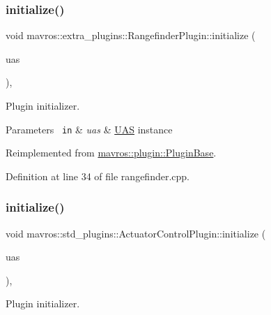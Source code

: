 \subsubsection{\texorpdfstring{initialize()}{initialize()}\hspace{0.1cm}{\footnotesize\ttfamily [3/41]}}
{\footnotesize\ttfamily void mavros\+::extra\+\_\+plugins\+::\+Rangefinder\+Plugin\+::initialize (\begin{DoxyParamCaption}\item[{\mbox{\hyperlink{classmavros_1_1UAS}{U\+AS}} \&}]{uas }\end{DoxyParamCaption})\hspace{0.3cm}{\ttfamily [inline]}, {\ttfamily [virtual]}}



Plugin initializer. 


\begin{DoxyParams}[1]{Parameters}
\mbox{\texttt{ in}}  & {\em uas} & {\ttfamily \mbox{\hyperlink{classmavros_1_1UAS}{U\+AS}}} instance \\
\hline
\end{DoxyParams}


Reimplemented from \mbox{\hyperlink{group__plugin_gad5313a41da4d26acbbabf008cdc21e82}{mavros\+::plugin\+::\+Plugin\+Base}}.



Definition at line 34 of file rangefinder.\+cpp.

\mbox{\label{group__plugin_ga5da058a4de90d9d0a05ff7b66f6d108b}} 
\subsubsection{\texorpdfstring{initialize()}{initialize()}\hspace{0.1cm}{\footnotesize\ttfamily [4/41]}}
{\footnotesize\ttfamily void mavros\+::std\+\_\+plugins\+::\+Actuator\+Control\+Plugin\+::initialize (\begin{DoxyParamCaption}\item[{\mbox{\hyperlink{classmavros_1_1UAS}{U\+AS}} \&}]{uas }\end{DoxyParamCaption})\hspace{0.3cm}{\ttfamily [inline]}, {\ttfamily [virtual]}}



Plugin initializer. 


